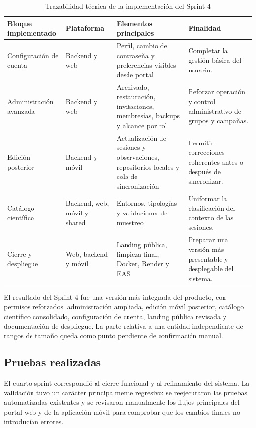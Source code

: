 \begin{table}[H]
\centering
\caption{Trazabilidad técnica de la implementación del Sprint 4}
\label{tab:implementacion_sprint4}
\scriptsize
\renewcommand{\arraystretch}{1.12}
\begin{tabularx}{\textwidth}{p{3.1cm}p{2.2cm}XX}
\toprule
Bloque implementado & Plataforma & Elementos principales & Finalidad \\
\midrule
Configuración de cuenta & Backend y web & Perfil, cambio de contraseña y preferencias visibles desde portal & Completar la gestión básica del usuario. \\
Administración avanzada & Backend y web & Archivado, restauración, invitaciones, membresías, backups y alcance por rol & Reforzar operación y control administrativo de grupos y campañas. \\
Edición posterior & Backend y móvil & Actualización de sesiones y observaciones, repositorios locales y cola de sincronización & Permitir correcciones coherentes antes o después de sincronizar. \\
Catálogo científico & Backend, web, móvil y shared & Entornos, tipologías y validaciones de muestreo & Uniformar la clasificación del contexto de las sesiones. \\
Cierre y despliegue & Web, backend y móvil & Landing pública, limpieza final, Docker, Render y EAS & Preparar una versión más presentable y desplegable del sistema. \\
\bottomrule
\end{tabularx}
\end{table}

El resultado del Sprint 4 fue una versión más integrada del producto, con
permisos reforzados, administración ampliada, edición móvil posterior,
catálogo científico consolidado, configuración de cuenta, landing pública
revisada y documentación de despliegue. La parte relativa a una entidad
independiente de rangos de tamaño queda como punto pendiente de confirmación
manual.
\subsection{Pruebas realizadas}

El cuarto sprint correspondió al cierre funcional y al refinamiento del sistema. La validación tuvo un carácter principalmente regresivo: se reejecutaron las pruebas automatizadas existentes y se revisaron manualmente los flujos principales del portal web y de la aplicación móvil para comprobar que los cambios finales no introducían errores.


